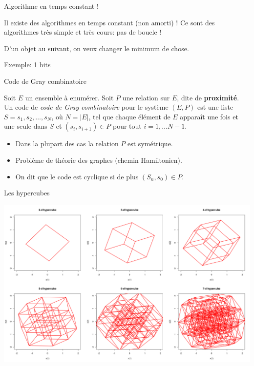 \documentclass{beamer}
\begin{document}
\begin{frame}{Algorithme en temps constant !}

  \begin{NOTE}
    Il existe des algorithmes en temps constant (non amorti) ! Ce sont des
    algorithmes très simple et très cours: pas de boucle !
  \end{NOTE}
  \bigskip\pause

  \begin{problem}
    D'un objet au suivant, on veux changer le minimum de chose.
  \end{problem}
  \bigskip\pause
  Exemple: 1 bits
\end{frame}

\begin{frame}{Code de Gray combinatoire}

  \begin{DEFN}
    Soit $E$ un ensemble à enumérer. Soit $P$ une relation sur $E$, dite de
    \textbf{proximité}. Un code de \emph{code de Gray combinatoire} pour le
    système $(E, P)$ est une liste $S = s_1, s_2, \dots, s_N$, où $N=|E|$, tel
    que chaque élément de $E$ apparaît une fois et une seule dans $S$ et
    $(s_i,s_{i+1})\in P$ pour tout $i = 1,\dots N-1$.
  \end{DEFN}
  \pause\bigskip
  \begin{itemize}
  \item Dans la plupart des cas la relation $P$ est symétrique.
  \pause\medskip
  \item Problème de théorie des graphes (chemin Hamiltonien).
  \pause\medskip
  \item On dit que le code est cyclique si de plus $(S_n, s_0)\in P$.
  \end{itemize}
\end{frame}

\begin{frame}{Les hypercubes}

  \includegraphics[width=\textwidth]{media/hcube.png}
\end{frame}
\end{document}
